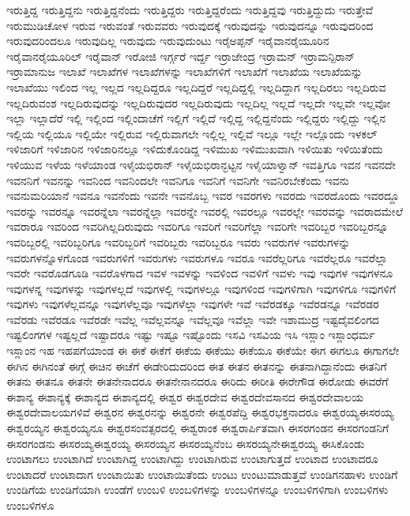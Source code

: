 {ಇರುತ್ತಿದ್ದ
ಇರುತ್ತಿದ್ದನು
ಇರುತ್ತಿದ್ದನೆಂದು
ಇರುತ್ತಿದ್ದರು
ಇರುತ್ತಿದ್ದರೆಂದು
ಇರುತ್ತಿದ್ದವು
ಇರುತ್ತಿದ್ದುದು
ಇರುತ್ತೇವೆ
ಇರುಮುಡಿಚೋಳ
ಇರುವ
ಇರುವಂತೆ
ಇರುವವರು
ಇರುವುದಕ್ಕೆ
ಇರುವುದನ್ನು
ಇರುವುದನ್ನೂ
ಇರುವುದರಿಂದ
ಇರುವುದರಿಂದಲೂ
ಇರುವುದಿಲ್ಲ
ಇರುವುದು
ಇರುವುದುಂಟು
ಇರೈಅಪ್ಪನ್
ಇರೈವಾನರೈಯೂರಿನ
ಇರೈವಾನರೈಯೂರಿಲ್
ಇರೈವಾನ್
ಇರೋಜಿ
ಇರ್ಗ್ಗರೆ
ಇರ್ದ್ದ
ಇರ್ರಾಜೇಂದ್ರ
ಇರ್ರಾಮನ್
ಇರ್ರಾಮನ್ಪಿರಾನ್
ಇರ್ರಾಮಾನುಜ
ಇಲಾಖೆ
ಇಲಾಖೆಗಳ
ಇಲಾಖೆಗಳನ್ನು
ಇಲಾಖೆಗಳಿಗೆ
ಇಲಾಖೆಗೆ
ಇಲಾಖೆಯ
ಇಲಾಖೆಯನ್ನು
ಇಲಾಖೆಯು
ಇಲಿಂದ
ಇಲ್ಲ
ಇಲ್ಲದ
ಇಲ್ಲದಿದ್ದರೂ
ಇಲ್ಲದಿದ್ದರೆ
ಇಲ್ಲದಿದ್ದಲ್ಲಿ
ಇಲ್ಲದಿದ್ದಾಗ
ಇಲ್ಲದಿರಲು
ಇಲ್ಲದಿರುವ
ಇಲ್ಲದಿರುವಂಶ
ಇಲ್ಲದಿರುವುದನ್ನು
ಇಲ್ಲದಿರುವುದರ
ಇಲ್ಲದಿರುವುದು
ಇಲ್ಲದಿಲ್ಲ
ಇಲ್ಲದೆ
ಇಲ್ಲದೇ
ಇಲ್ಲವೇ
ಇಲ್ಲವೋ
ಇಲ್ಲಾ
ಇಲ್ಲಾದೆರೆ
ಇಲ್ಲಿ
ಇಲ್ಲಿಂದ
ಇಲ್ಲಿಂದಾಚೆಗೆ
ಇಲ್ಲಿಗೆ
ಇಲ್ಲಿದೆ
ಇಲ್ಲಿದ್ದ
ಇಲ್ಲಿದ್ದನೆಂದು
ಇಲ್ಲಿದ್ದರು
ಇಲ್ಲಿದ್ದು
ಇಲ್ಲಿನ
ಇಲ್ಲಿಯ
ಇಲ್ಲಿಯೂ
ಇಲ್ಲಿಯೇ
ಇಲ್ಲಿರುವ
ಇಲ್ಲಿರುವಾಗಲೇ
ಇಲ್ಲಿಲ್ಲ
ಇಲ್ಲಿವೆ
ಇಲ್ಲೂ
ಇಲ್ಲೇ
ಇಲ್ಲೊಂದು
ಇಳಕಲ್
ಇಳಿಜಾರಿಗೆ
ಇಳಿಜಾರಿನ
ಇಳಿಜಾರಿನಲ್ಲೂ
ಇಳಿದುಕೊಂಡಿದ್ದ
ಇಳಿಮುಖ
ಇಳಿಮುಖವಾಗಿ
ಇಳಿಯಿತು
ಇಳಿಯಿತೆಂದು
ಇಳಿಯುವ
ಇಳೆಯ
ಇಳೆಯಾಂಡ
ಇಳೈಯಭಿರಾನ್
ಇಳೈಯಭಿರಾನ್ಭಟ್ಟನ
ಇಳೈಯಾಳ್ವಾನ್
ಇವತ್ತಿಗೂ
ಇವನ
ಇವನದೇ
ಇವನನಿಗೆ
ಇವನನ್ನು
ಇವನಿಂದ
ಇವನಿಂದಲೇ
ಇವನಿಗೂ
ಇವನಿಗೆ
ಇವನಿಗೇ
ಇವನಿರಬೇಕೆಂದು
ಇವನು
ಇವನುಮರಿಯಾನೆ
ಇವನೂ
ಇವನೆಂದು
ಇವನೇ
ಇವನೊಬ್ಬ
ಇವರ
ಇವರಗಳು
ಇವರದು
ಇವರದೊಂದು
ಇವರದ್ದೂ
ಇವರನ್ನು
ಇವರನ್ನೂ
ಇವರನ್ನೆಲಾ
ಇವರನ್ನೆಲ್ಲಾ
ಇವರನ್ನೇ
ಇವರಲ್ಲಿ
ಇವರಲ್ಲೂ
ಇವರಲ್ಲೇ
ಇವರವನ್ನು
ಇವರಾದಮೇಲೆ
ಇವರಾರೂ
ಇವರಿಂದ
ಇವರಿಗಿಲ್ಲದಿರುವುದು
ಇವರಿಗೂ
ಇವರಿಗೆ
ಇವರಿಗೆಲ್ಲಾ
ಇವರಿಗೇ
ಇವರಿಬ್ಬರ
ಇವರಿಬ್ಬರನ್ನೂ
ಇವರಿಬ್ಬರಲ್ಲಿ
ಇವರಿಬ್ಬರಿಗೂ
ಇವರಿಬ್ಬರಿಗೆ
ಇವರಿಬ್ಬರು
ಇವರಿಬ್ಬರೂ
ಇವರು
ಇವರುಗಳ
ಇವರುಗಳನ್ನು
ಇವರುಗಳನ್ನೊಳಗೊಂಡ
ಇವರುಗಳಿಗೆ
ಇವರುಗಳು
ಇವರುಗಳೂ
ಇವರೂ
ಇವರೆಲ್ಲರಿಗೂ
ಇವರೆಲ್ಲರೂ
ಇವರೆಲ್ಲಾ
ಇವರೇ
ಇವರೊಡಗೂಡಿ
ಇವರೊಳಗಾದ
ಇವಳ
ಇವಳನ್ನು
ಇವಳಿಂದ
ಇವಳಿಗೆ
ಇವಳು
ಇವು
ಇವುಗಳ
ಇವುಗಳನೂ
ಇವುಗಳನ್ನ
ಇವುಗಳನ್ನು
ಇವುಗಳಲ್ಲದೆ
ಇವುಗಳಲ್ಲಿ
ಇವುಗಳಲ್ಲೂ
ಇವುಗಳಿಂದ
ಇವುಗಳಿಗಾಗಿ
ಇವುಗಳಿಗೂ
ಇವುಗಳಿಗೆ
ಇವುಗಳು
ಇವುಗಳೆಲ್ಲವನ್ನೂ
ಇವುಗಳೆಲ್ಲವೂ
ಇವುಗಳೆಲ್ಲಾ
ಇವುಗಳೇ
ಇವೆ
ಇವೆರಡಕ್ಕೂ
ಇವೆರಡನ್ನೂ
ಇವೆರಡರ
ಇವೆರಡು
ಇವೆರಡೂ
ಇವೆರಡೇ
ಇವೆಲ್ಲ
ಇವೆಲ್ಲವನ್ನೂ
ಇವೆಲ್ಲವೂ
ಇವೆಲ್ಲಾ
ಇವೇ
ಇಶಾಮುದ್ರ
ಇಷ್ಟದೈವಲಿಂಗದ
ಇಷ್ಟಲಿಂಗಗಳ
ಇಷ್ಟಲ್ಲದೆ
ಇಷ್ಟಾದರೂ
ಇಷ್ಟು
ಇಷ್ಟೂ
ಇಷ್ಟೊಂದು
ಇಸವಿ
ಇಸವಿಯ
ಇಸಿ
ಇಸ್ಲಾಂ
ಇಸ್ಲಾಂಧರ್ಮ
ಇಸ್ಲಾಂನ
ಇಹ
ಇಹಪಗೆಯಾಂಡ
ಈ
ಈಕೆ
ಈಕೆಗೆ
ಈಕೆಯ
ಈಕೆಯು
ಈಕೆಯೂ
ಈಕೆಯೇ
ಈಗ
ಈಗಲೂ
ಈಗಾಗಲೇ
ಈಗಿನ
ಈಗಿನಂತೆ
ಈಗ್ಗೆ
ಈಚಿನ
ಈಚೆಗೆ
ಈಡೇರಿದುದರಿಂದ
ಈತ
ಈತನ
ಈತನನ್ನು
ಈತನಾಗಿದ್ದಾನೆಂದು
ಈತನಿಗೆ
ಈತನು
ಈತನೂ
ಈತನೇ
ಈತನೇನಾದರೂ
ಈತನೇನಾನದರೂ
ಈರಿದು
ಈರೀತಿ
ಈರೇಗೌಡ
ಈರೋಡು
ಈವರೆಗೆ
ಈಶಾನ್ಯ
ಈಶಾನ್ಯಕ್ಕೆ
ಈಶಾನ್ಯದ
ಈಶಾನ್ಯದಲ್ಲಿ
ಈಶ್ವರ
ಈಶ್ವರದೇವ
ಈಶ್ವರದೇವಸಾನದ
ಈಶ್ವರದೇವಾಲಯ
ಈಶ್ವರದೇವಾಲಯಗಳಿವೆ
ಈಶ್ವರನ
ಈಶ್ವರನನ್ನು
ಈಶ್ವರನೇ
ಈಶ್ವರಪೆದ್ದಿ
ಈಶ್ವರಭಕ್ತನಾದರೂ
ಈಶ್ವರಯ್ಯಈಸರಯ್ಯ
ಈಶ್ವರಯ್ಯನ
ಈಶ್ವರಯ್ಯನೂ
ಈಶ್ವರಸಂವತ್ಸರದಲ್ಲಿ
ಈಶ್ವರಾಂಕ
ಈಶ್ವರಾರ್ಪಿತವಾಗಿ
ಈಸರಗಂಡನ
ಈಸರಗಂಡನಿಗೆ
ಈಸರಗಂಡನು
ಈಸರಯ್ಯಈಶ್ವರಯ್ಯ
ಈಸರಯ್ಯನ
ಈಸರಯ್ಯನೆಂಬ
ಈಸರಯ್ಯನೇಈಶ್ವರಯ್ಯ
ಈಸಿಕೊಂಡು
ಉಂಟಾಗಲು
ಉಂಟಾಗಿದೆ
ಉಂಟಾಗಿದ್ದ
ಉಂಟಾಗಿದ್ದು
ಉಂಟಾಗಿರುವ
ಉಂಟಾಗುತ್ತದೆ
ಉಂಟಾದ
ಉಂಟಾದರೂ
ಉಂಟಾದರೆ
ಉಂಟಾದಾಗ
ಉಂಟಾಯಿತು
ಉಂಟಾಯಿತೆಂದು
ಉಂಟು
ಉಂಟುಮಾಡುತ್ತವೆ
ಉಂಡಿಗನಹಾಳು
ಉಂಡಿಗೆ
ಉಂಡಿಗೆಯ
ಉಂಡಿಗೆಯಾಗಿ
ಉಂಡೆಗೆ
ಉಂಬಳಿ
ಉಂಬಳಿಗಳನ್ನು
ಉಂಬಳಿಗಳನ್ನೂ
ಉಂಬಳಿಗಳಿಗಾಗಿ
ಉಂಬಳಿಗಳು
ಉಂಬಳಿಗಳೂ
}
